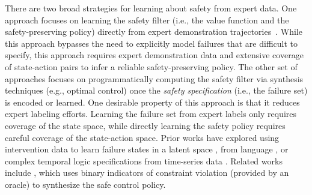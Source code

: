 There are two broad strategies for learning about safety from expert data. One approach focuses on learning the safety filter (i.e., the value function and the safety-preserving policy) directly from expert demonstration trajectories~\cite{lindemann2024learning, robey2020learning, leung2023learning, chou2020learning, chou2020learninguncertainty, scobee2019maximum, kim2024learning, lindner2024learning}. While this approach bypasses the need to explicitly model failures that are difficult to specify, this approach requires expert demonstration data and extensive coverage of state-action pairs to infer a reliable safety-preserving policy. 
The other set of approaches focuses on programmatically computing the safety filter via synthesis techniques (e.g., optimal control) once the \textit{safety specification} (i.e., the failure set) is encoded or learned. One desirable property of this approach is that it reduces expert labeling efforts. 
Learning the failure set from expert labels only requires coverage of the state space, while directly learning the safety policy requires careful coverage of the state-action space.
Prior works have explored using intervention data to learn failure states in a latent space \cite{liu2023modelbasedruntimemonitoringinteractive, liumulti}, from language \cite{finucane2010ltlmop}, or complex temporal logic specifications from time-series data \cite{bartocci2022survey}. Related works include \cite{srinivasan2020learning, thananjeyan2021recovery}, which uses binary indicators of constraint violation (provided by an oracle) to synthesize the safe control policy.
